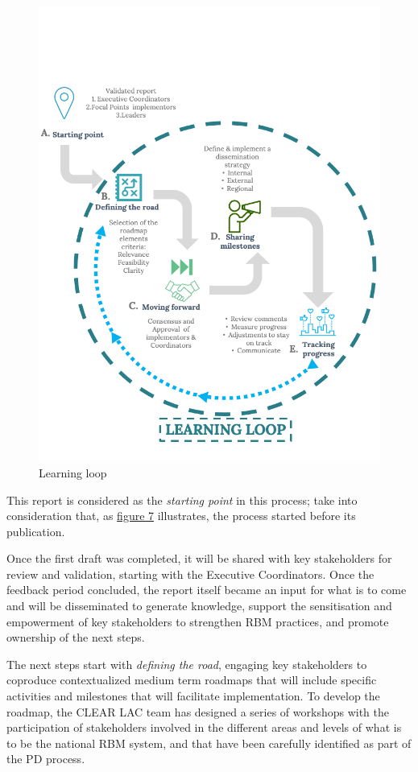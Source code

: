 \documentclass[
  10pt,
]{book}
\begin{document}
\begin{figure}
\includegraphics[width=1\linewidth]{./images/figure_7} \caption{Learning loop}\label{fig:figure7}
\end{figure}

This report is considered as the \emph{starting point} in this process; take into consideration that, as \protect\hyperlink{fig:figure7}{figure 7} illustrates, the process started before its publication.

Once the first draft was completed, it will be shared with key stakeholders for review and validation, starting with the Executive Coordinators. Once the feedback period concluded, the report itself became an input for what is to come and will be disseminated to generate knowledge, support the sensitisation and empowerment of key stakeholders to strengthen RBM practices, and promote ownership of the next steps.

The next steps start with \emph{defining the road}, engaging key stakeholders to coproduce contextualized medium term roadmaps that will include specific activities and milestones that will facilitate implementation. To develop the roadmap, the CLEAR LAC team has designed a series of workshops with the participation of stakeholders involved in the different areas and levels of what is to be the national RBM system, and that have been carefully identified as part of the PD process.
\end{document}
